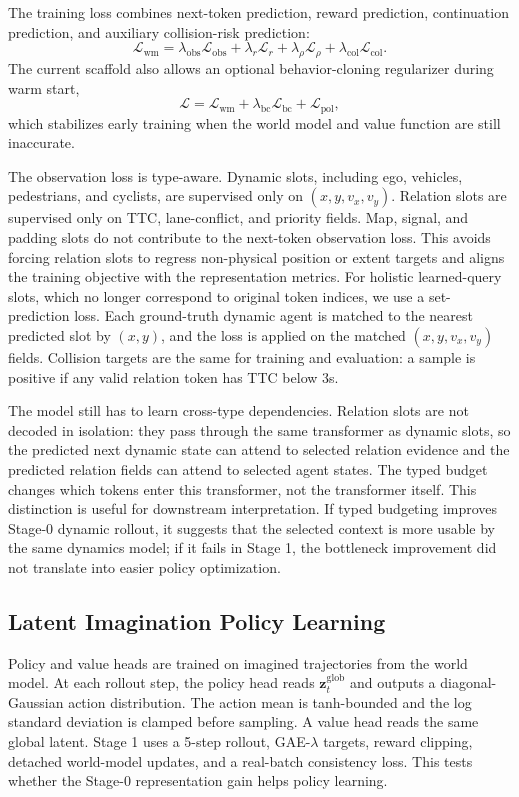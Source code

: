 \documentclass[10pt,journal,compsoc]{IEEEtran}
\begin{document}
The training loss combines next-token prediction, reward prediction, continuation prediction, and auxiliary collision-risk prediction:
\begin{equation}
\mathcal{L}_{\mathrm{wm}} =
\lambda_{\mathrm{obs}}\mathcal{L}_{\mathrm{obs}} +
\lambda_{r}\mathcal{L}_{r} +
\lambda_{\rho}\mathcal{L}_{\rho} +
\lambda_{\mathrm{col}}\mathcal{L}_{\mathrm{col}}.
\label{eq:wmloss}
\end{equation}
The current scaffold also allows an optional behavior-cloning regularizer during warm start,
\begin{equation}
\mathcal{L} = \mathcal{L}_{\mathrm{wm}} + \lambda_{\mathrm{bc}}\mathcal{L}_{\mathrm{bc}} + \mathcal{L}_{\mathrm{pol}},
\label{eq:totalloss}
\end{equation}
which stabilizes early training when the world model and value function are still inaccurate.

The observation loss is type-aware. Dynamic slots, including ego, vehicles, pedestrians, and cyclists, are supervised only on $(x,y,v_x,v_y)$. Relation slots are supervised only on TTC, lane-conflict, and priority fields. Map, signal, and padding slots do not contribute to the next-token observation loss. This avoids forcing relation slots to regress non-physical position or extent targets and aligns the training objective with the representation metrics. For holistic learned-query slots, which no longer correspond to original token indices, we use a set-prediction loss. Each ground-truth dynamic agent is matched to the nearest predicted slot by $(x,y)$, and the loss is applied on the matched $(x,y,v_x,v_y)$ fields. Collision targets are the same for training and evaluation: a sample is positive if any valid relation token has TTC below 3s.

The model still has to learn cross-type dependencies. Relation slots are not decoded in isolation: they pass through the same transformer as dynamic slots, so the predicted next dynamic state can attend to selected relation evidence and the predicted relation fields can attend to selected agent states. The typed budget changes which tokens enter this transformer, not the transformer itself. This distinction is useful for downstream interpretation. If typed budgeting improves Stage-0 dynamic rollout, it suggests that the selected context is more usable by the same dynamics model; if it fails in Stage 1, the bottleneck improvement did not translate into easier policy optimization.

\subsection{Latent Imagination Policy Learning}
Policy and value heads are trained on imagined trajectories from the world model. At each rollout step, the policy head reads $\mathbf{z}^{\mathrm{glob}}_t$ and outputs a diagonal-Gaussian action distribution. The action mean is tanh-bounded and the log standard deviation is clamped before sampling. A value head reads the same global latent. Stage 1 uses a 5-step rollout, GAE-$\lambda$ targets, reward clipping, detached world-model updates, and a real-batch consistency loss. This tests whether the Stage-0 representation gain helps policy learning.
\end{document}
